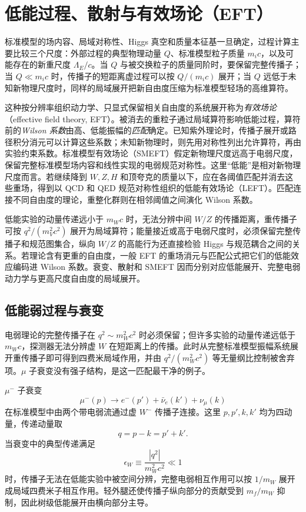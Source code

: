 \section{低能过程、散射与有效场论（EFT）}\label{sec:sm-processes-rg-eft-dp11}

标准模型的场内容、局域对称性、Higgs 真空和质量本征基一旦确定，过程计算主要比较三个尺度：外部过程的典型物理动量 $Q$、标准模型粒子质量 $m_ic$，以及可能存在的新重尺度 $\Lambda_E/c$。当 $Q$ 与被交换粒子的质量同阶时，要保留完整传播子；当 $Q\ll m_ic$ 时，传播子的短距离虚过程可以按 $Q/(m_ic)$ 展开；当 $Q$ 远低于未知新物理尺度时，同样的局域展开把新自由度压缩为标准模型轻场的高维算符。

这种按分辨率组织动力学、只显式保留相关自由度的系统展开称为\emph{有效场论}（effective field theory, EFT）。被消去的重粒子通过局域算符影响低能过程，算符前的\emph{Wilson 系数}由高、低能振幅的\emph{匹配}确定。已知紫外理论时，传播子展开或路径积分消元可以计算这些系数；未知新物理时，则先用对称性列出允许算符，再由实验约束系数。标准模型有效场论（SMEFT）假定新物理尺度远高于电弱尺度，保留完整标准模型场内容和线性实现的电弱规范对称性。这里“低能”是相对新物理尺度而言。若继续降到 $W,Z,H$ 和顶夸克的质量以下，应在各阈值匹配并消去这些重场，得到以 QCD 和 QED 规范对称性组织的低能有效场论（LEFT）。匹配连接不同自由度的理论，重整化群则在相邻阈值之间演化 Wilson 系数。

低能实验的动量传递远小于 $m_Wc$ 时，无法分辨中间 $W/Z$ 的传播距离，重传播子可按 $q^2/(m_V^2c^2)$ 展开为局域算符；能量接近或高于电弱尺度时，必须保留完整传播子和规范图集合，纵向 $W/Z$ 的高能行为还直接检验 Higgs 与规范耦合之间的关系。若理论含有更重的自由度，一般 EFT 的重场消元与匹配公式把它们的低能效应编码进 Wilson 系数。衰变、散射和 SMEFT 因而分别对应低能展开、完整电弱动力学与更高尺度自由度的局域展开。

\subsection{低能弱过程与衰变}

电弱理论的完整传播子在 \(q^2\sim m_W^2c^2\) 时必须保留；但许多实验的动量传递远低于 \(m_Wc\)，探测器无法分辨虚 \(W\) 在短距离上的传播。此时从完整标准模型振幅系统展开重传播子即可得到四费米局域作用，并由 $q^2/(m_W^2c^2)$ 等无量纲比控制被舍弃项。$\mu$ 子衰变没有强子结构，是这一匹配最干净的例子。

$\mu^-$ 子衰变
\begin{equation*}
 \mu^-(p)\to e^-(p')+\bar\nu_e(k')+\nu_\mu(k)
\end{equation*}
在标准模型中由两个带电弱流通过虚 $W^-$ 传播子连接。这里 $p,p',k,k'$ 均为四动量，传递动量取
\begin{equation*}
 q=p-k=p'+k'.
\end{equation*}
当衰变中的典型传递满足
\begin{equation*}
 \epsilon_W\equiv\frac{|q^2|}{m_W^2c^2}\ll1
\end{equation*}
时，传播子无法在低能实验中被空间分辨，完整电弱相互作用可以按 $1/m_W$ 展开成局域四费米子相互作用。轻外腿还使传播子纵向部分的贡献受到 $m_f/m_W$ 抑制，因此树级低能展开由横向部分主导。


